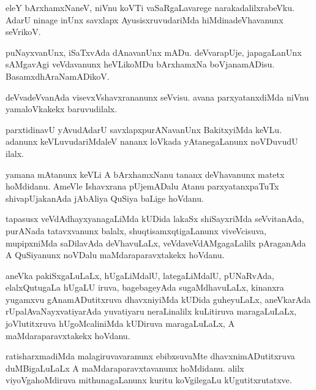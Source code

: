 \documentclass{article}
\begin{document}
\begin{mn}
eleY  bArxhamxNaneV,  niVnu  koVTi  vaSaRgaLavarege  narakadalilxrabeVku.  AdarU  ninage  inUnx  
savxlapx  AyusisxruvudariMda  hiMdinadeVhavanunx  seVrikoV.
\end{mn}

\begin{mn}
puNayxvanUnx,  iSaTxvAda  dAnavanUnx  mADu.  deVvarapUje,  japagaLanUnx  sAMgavAgi  veVdavanunx  
heVLikoMDu  bArxhamxNa  boVjanamADisu.  BasamxdhAraNamADikoV.
\end{mn}

\begin{mn}
deVvadeVvanAda  visevxVshavxrananunx  seVvisu.  avana  parxyatanxdiMda  niVnu  yamaloVkakekx  baruvudilalx.
\end{mn}

\begin{mn}
parxtidinavU  yAvudAdarU  savxlapxpurANavanUnx  BakitxyiMda  keVLu.  adanunx  keVLuvudariMdaleV  
nananx  loVkada  yAtanegaLanunx  noVDuvudU  ilalx.
\end{mn}

\begin{mn}
yamana  mAtanunx  keVLi  A  bArxhamxNanu  tananx  deVhavanunx  matetx  hoMdidanu.  AmeVle  
Ishavxrana  pUjemADalu  Atanu  parxyatanxpaTuTx  shivapUjakanAda  jAbAliya  QuSiya  baLige  hoVdanu. 
\end{mn}

\begin{mn}
tapasusx  veVdAdhayxyanagaLiMda  kUDida  lakaSx  shiSayxriMda  seVvitanAda,  purANada  tatavxvanunx  
balalx,  shuqtisamxqtigaLanunx  viveVcisuva,  mupipxniMda  saDilavAda  deVhavuLaLx,  
veVdaveVdAMgagaLalilx  pAraganAda  A  QuSiyanunx  noVDalu  maMdaraparavxtakekx  hoVdanu.
\end{mn}

\begin{mn}
aneVka  pakiSxgaLuLaLx,  hUgaLiMdalU,  lategaLiMdalU,  pUNaRvAda,  elalxQutugaLa  hUgaLU  iruva,  
bagebageyAda  sugaMdhavuLaLx,  kinanxra  yugamxvu  gAnamADutitxruva  dhavxniyiMda  kUDida  
guheyuLaLx,  aneVkarAda  rUpalAvaNayxvatiyarAda  yuvatiyaru  neraLinalilx  kuLitiruva  maragaLuLaLx,  
joVlutitxruva  hUgoMcaliniMda  kUDiruva  maragaLuLaLx,  A  maMdaraparavxtakekx  hoVdanu.
\end{mn}

\begin{mn}
ratisharxmadiMda  malagiruvavaranunx  ebibxsuvaMte  dhavxnimADutitxruva  duMBigaLuLaLx  A  maMdaraparavxtavanunx  
hoMdidanu.  alilx  viyoVgahoMdiruva  mithunagaLanunx  kuritu  koVgilegaLu  kUgutitxrutatxve.
\end{mn}
\end{document}
